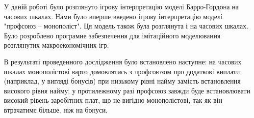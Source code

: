 
У даній роботі було розглянуто ігрову інтерпретацію моделі Барро-Гордона на часових шкалах. Нами було вперше введено ігрову інтерпретацію моделі "профсоюз -- монополіст". Ця модель також була розглянута і на часових шкалах. Було розроблено програмне забезпечення для імітаційного моделювання розглянутих макроекономічних ігр.

В результаті проведенного дослідження було встановлено наступне: на часових шкалах монополістові варто домовлятись з профсоюзом про додаткові виплати (наприклад, у вигляді бонусів) при низькому рівні найму замість встановлення високого рівня найму; у протилежному разі профсоюз завжди буде встановлювати високий рівень заробітних плат, що не вигідно монополістові, так як він втрачатимє більше, ніж на бонуси.
